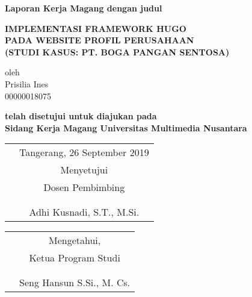 
\begin{center}
    
\textbf{Laporan Kerja Magang dengan judul\linebreak[1]}

\textbf{ IMPLEMENTASI FRAMEWORK HUGO \\
    PADA WEBSITE PROFIL PERUSAHAAN \\
    (STUDI KASUS: PT. BOGA PANGAN SENTOSA)}
\end{center}


\begin{center}
oleh\\
Prisilia Ines\\
00000018075\linebreak[2]

\textbf{telah disetujui untuk diajukan pada \\ 
        Sidang Kerja Magang Universitas Multimedia Nusantara\linebreak[2]}
\end{center}

\begin{center}

    \begin{tabular}{p{0cm}c}
        &Tangerang, 26 September 2019\\
        &Menyetujui\\
        &Dosen Pembimbing\\
        &\\
        &\\
        &{Adhi Kusnadi, S.T., M.Si.}
    \end{tabular}

    \begin{tabular}{p{0cm}c}
        &Mengetahui,\\
        &Ketua Program Studi\\
        &\\
        &\\
        &{Seng Hansun S.Si., M. Cs.}
    \end{tabular}
    
\end{center}
